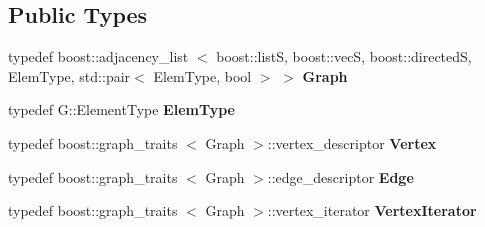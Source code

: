 \subsection*{\-Public \-Types}
\begin{DoxyCompactItemize}
\item 
\hypertarget{classcCayleyGrf_aa6ec3ba98e73a5c244786d88e05dc380}{
typedef boost\-::adjacency\-\_\-list\*
$<$ boost\-::list\-S, boost\-::vec\-S, \*
boost\-::directed\-S, \-Elem\-Type, \*
std\-::pair$<$ \-Elem\-Type, bool $>$ $>$ {\bfseries \-Graph}}
\label{classcCayleyGrf_aa6ec3ba98e73a5c244786d88e05dc380}

\item 
\hypertarget{classcCayleyGrf_a96e2347884f970817ad4f941ff85f478}{
typedef \-G\-::\-Element\-Type {\bfseries \-Elem\-Type}}
\label{classcCayleyGrf_a96e2347884f970817ad4f941ff85f478}

\item 
\hypertarget{classcCayleyGrf_a1ef27f6e825137691b820322094745b3}{
typedef boost\-::graph\-\_\-traits\*
$<$ \-Graph $>$\-::vertex\-\_\-descriptor {\bfseries \-Vertex}}
\label{classcCayleyGrf_a1ef27f6e825137691b820322094745b3}

\item 
\hypertarget{classcCayleyGrf_abade7422415758e7d2699ccfa052accb}{
typedef boost\-::graph\-\_\-traits\*
$<$ \-Graph $>$\-::edge\-\_\-descriptor {\bfseries \-Edge}}
\label{classcCayleyGrf_abade7422415758e7d2699ccfa052accb}

\item 
\hypertarget{classcCayleyGrf_a8a2a9d7e45de509f97daf663b6827496}{
typedef boost\-::graph\-\_\-traits\*
$<$ \-Graph $>$\-::vertex\-\_\-iterator {\bfseries \-Vertex\-Iterator}}
\label{classcCayleyGrf_a8a2a9d7e45de509f97daf663b6827496}

\end{DoxyCompactItemize}
